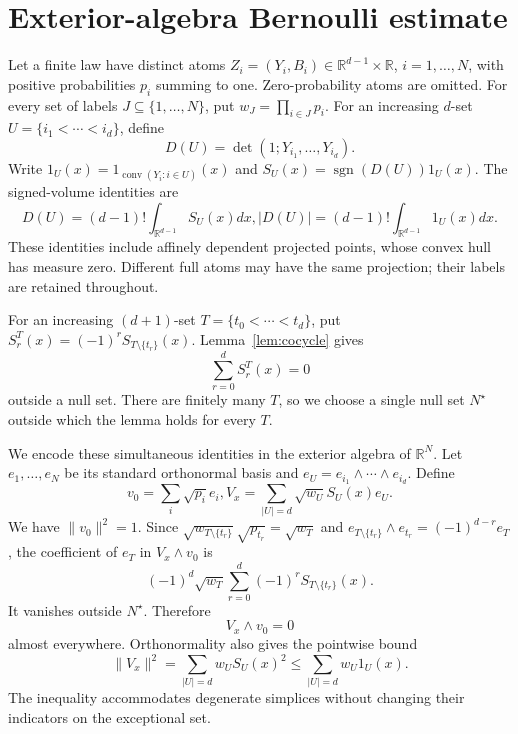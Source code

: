 \documentclass[11pt]{article}
\theoremstyle{remark}
\newcommand{\R}{\mathbb{R}}
\newcommand{\conv}{\operatorname{conv}}
\newcommand{\sgn}{\operatorname{sgn}}
\newcommand{\one}{1}
\begin{document}
\section{Exterior-algebra Bernoulli estimate}
\label{sec:exterior}
\begin{aiblock}


Let a finite law have distinct atoms
$Z_i=(Y_i,B_i)\in\R^{d-1}\times\R$, $i=1,\ldots,N$, with positive probabilities $p_i$
summing to one. Zero-probability atoms are omitted. For every set of
labels $J\subseteq\{1,\ldots,N\}$, put $w_J=\prod_{i\in J}p_i$.
For an increasing $d$-set $U=\{i_1<\cdots<i_d\}$, define
\begin{equation}
D(U)=\det(1;Y_{i_1},\ldots,Y_{i_d}).
\end{equation}
Write $\one_U(x)=\one_{\conv(Y_i:i\in U)}(x)$ and
$S_U(x)=\sgn(D(U))\one_U(x)$. The signed-volume identities are
$$D(U)=(d-1)!\int_{\R^{d-1}}S_U(x)dx, |D(U)|=(d-1)!\int_{\R^{d-1}}\one_U(x)dx.$$
These identities include affinely dependent projected points, whose
convex hull has measure zero. Different full atoms may have the same
projection; their labels are retained throughout.

For an increasing $(d+1)$-set $T=\{t_0<\cdots<t_d\}$, put
$S_r^T(x)=(-1)^rS_{T\setminus\{t_r\}}(x)$.
Lemma~\ref{lem:cocycle} gives
\begin{equation}
\sum_{r=0}^dS_r^T(x)=0
\end{equation}
outside a null set. There are finitely many $T$, so we choose a single
null set $N^\star$ outside which the lemma holds for every $T$.

We encode these simultaneous identities in the exterior algebra of
$\R^N$. Let $e_1,\ldots,e_N$ be its standard orthonormal basis and
$e_U=e_{i_1}\wedge\cdots\wedge e_{i_d}$. Define
$$v_0=\sum_i\sqrt{p_i}e_i, V_x=\sum_{|U|=d}\sqrt{w_U}S_U(x)e_U.$$
We have $\|v_0\|^2=1$. Since
$\sqrt{w_{T\setminus\{t_r\}}}\sqrt{p_{t_r}}=\sqrt{w_T}$ and
$e_{T\setminus\{t_r\}}\wedge e_{t_r}=(-1)^{d-r}e_T$, the coefficient
of $e_T$ in $V_x\wedge v_0$ is
\begin{equation}
(-1)^d\sqrt{w_T}\sum_{r=0}^d(-1)^rS_{T\setminus\{t_r\}}(x).
\end{equation}
It vanishes outside $N^\star$. Therefore
\begin{equation}
V_x\wedge v_0=0
\end{equation}
almost everywhere. Orthonormality also gives the pointwise bound
\begin{equation}
\|V_x\|^2=\sum_{|U|=d}w_US_U(x)^2\leq\sum_{|U|=d}w_U\one_U(x).
\end{equation}
The inequality accommodates degenerate simplices without changing their
indicators on the exceptional set.


\end{aiblock}
\end{document}
